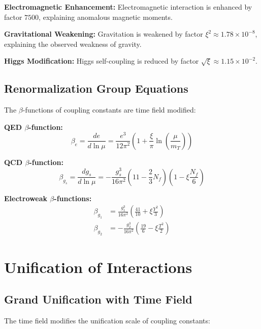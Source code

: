 \documentclass[12pt,a4paper]{report}
\newcommand{\xipar}{\xi}      %
\begin{document}
\textbf{Electromagnetic Enhancement:}
Electromagnetic interaction is enhanced by factor $7500$, explaining anomalous magnetic moments.

\textbf{Gravitational Weakening:}
Gravitation is weakened by factor $\xipar^2 \approx 1.78 \times 10^{-8}$, explaining the observed weakness of gravity.

\textbf{Higgs Modification:}
Higgs self-coupling is reduced by factor $\sqrt{\xipar} \approx 1.15 \times 10^{-2}$.

\subsection{Renormalization Group Equations}\label{subsec:renormalization_group}

The $\beta$-functions of coupling constants are time field modified:

\textbf{QED $\beta$-function:}
\begin{equation}
	\beta_e = \frac{de}{d\ln\mu} = \frac{e^3}{12\pi^2} \left(1 + \frac{\xipar}{\pi} \ln\left(\frac{\mu}{m_T}\right)\right)
\end{equation}

\textbf{QCD $\beta$-function:}
\begin{equation}
	\beta_{g_s} = \frac{dg_s}{d\ln\mu} = -\frac{g_s^3}{16\pi^2} \left(11 - \frac{2}{3} N_f\right) \left(1 - \xipar \frac{N_f}{6}\right)
\end{equation}

\textbf{Electroweak $\beta$-functions:}
\begin{align}
	\beta_{g_1} &= \frac{g_1^3}{16\pi^2} \left(\frac{41}{10} + \xipar \frac{Y^2}{3}\right) \\
	\beta_{g_2} &= -\frac{g_2^3}{16\pi^2} \left(\frac{19}{6} - \xipar \frac{T^2}{2}\right)
\end{align}

	\section{Unification of Interactions}\label{sec:unification}
	
	\subsection{Grand Unification with Time Field}\label{subsec:grand_unification}
	
	The time field modifies the unification scale of coupling constants:
	
\end{document}
